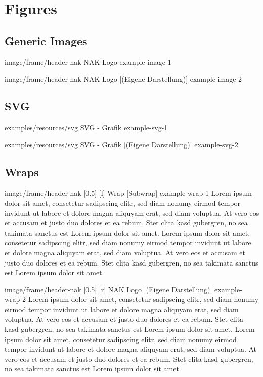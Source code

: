 \chapter{Figures}\label{ch:figures}

\section{Generic Images}\label{sec:figures-generic-images}
\image
{image/frame/header-nak}
{NAK Logo}
{example-image-1}

\image
{image/frame/header-nak}
{NAK Logo}
[(Eigene Darstellung)]
{example-image-2}

\section{SVG}\label{sec:figures-svg}
\svg
{examples/resources/svg}
{SVG - Grafik}
{example-svg-1}

\svg
{examples/resources/svg}
{SVG - Grafik}
[(Eigene Darstellung)]
{example-svg-2}

\section{Wraps}\label{sec:figurs-wrap}
\wrap
{image/frame/header-nak}
[0.5\linewidth]
[l] %
{Wrap}
[Subwrap] %
{example-wrap-1}
Lorem ipsum dolor sit amet, consetetur sadipscing elitr, sed diam nonumy eirmod tempor invidunt ut labore et dolore magna aliquyam erat, sed diam voluptua. At vero eos et accusam et justo duo dolores et ea rebum. Stet clita kasd gubergren, no sea takimata sanctus est Lorem ipsum dolor sit amet. Lorem ipsum dolor sit amet, consetetur sadipscing elitr, sed diam nonumy eirmod tempor invidunt ut labore et dolore magna aliquyam erat, sed diam voluptua. At vero eos et accusam et justo duo dolores et ea rebum. Stet clita kasd gubergren, no sea takimata sanctus est Lorem ipsum dolor sit amet.



\wrap
{image/frame/header-nak}
[0.5\linewidth]
[r] %
{NAK Logo}
[(Eigene Darstellung)]
{example-wrap-2}
Lorem ipsum dolor sit amet, consetetur sadipscing elitr, sed diam nonumy eirmod tempor invidunt ut labore et dolore magna aliquyam erat, sed diam voluptua. At vero eos et accusam et justo duo dolores et ea rebum. Stet clita kasd gubergren, no sea takimata sanctus est Lorem ipsum dolor sit amet. Lorem ipsum dolor sit amet, consetetur sadipscing elitr, sed diam nonumy eirmod tempor invidunt ut labore et dolore magna aliquyam erat, sed diam voluptua. At vero eos et accusam et justo duo dolores et ea rebum. Stet clita kasd gubergren, no sea takimata sanctus est Lorem ipsum dolor sit amet.